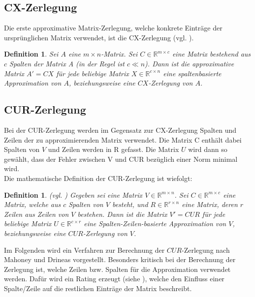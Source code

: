 \documentclass[12pt,a4paper,twoside]{article}
\newtheorem{Definition}[Satz]{Definition}
\begin{document}
	\subsection{CX-Zerlegung}
		\label{subsec:CX}
		Die erste approximative Matrix-Zerlegung, welche konkrete Einträge der ursprünglichen Matrix verwendet, ist die CX-Zerlegung (vgl. \citep{Drineas2009}). 
		\begin{Definition}
			Sei $A$ eine $m\times n$-Matrix. Sei $C\in \mathds{R}^{m\times c}$ eine Matrix bestehend aus $c$ Spalten der Matrix A (in der Regel ist $c\ll n$). Dann ist die approximative Matrix $A'=CX$ für jede beliebige Matrix $X\in \mathds{R}^{c\times n}$ eine spaltenbasierte Approximation von $A$, beziehungsweise eine $CX$-Zerlegung von $A$.
		\end{Definition}
	\subsection{CUR-Zerlegung}	
		\label{subsec:CUR}
		Bei der CUR-Zerlegung werden im Gegensatz zur CX-Zerlegung Spalten und Zeilen der zu approximierenden Matrix 
		verwendet. Die Matrix C enthält dabei Spalten von $V$ und Zeilen werden in R gefasst. Die Matrix $U$ wird 
		dann so gewählt, dass der Fehler zwischen V und CUR bezüglich einer Norm minimal wird. \\
		Die mathematische Definition der CUR-Zerlegung ist wiefolgt:
		\begin{Definition}{(vgl. \citep{Drineas2009})}
			Gegeben sei eine Matrix $V\in \mathds{R}^{m\times n}$. Sei $C\in\mathds{R}^{m\times 
			c}$ eine Matrix, welche aus $c$ Spalten von $V$ besteht, und $R\in\mathds{R}^{r\times n}$ eine Matrix, 
			deren $r$ Zeilen aus Zeilen von $V$ bestehen. Dann ist die Matrix $V'=CUR$ für jede beliebige Matrix $U
			\in\mathds{R}^{c\times r}$ eine Spalten-Zeilen-basierte Approximation von $V$, beziehungsweise eine $CUR
			$-Zerlegung von $V$.
		\end{Definition}
		Im Folgenden wird ein Verfahren zur Berechnung der $CUR$-Zerlegung nach Mahoney und Drineas \citep{mahoney2008} vorgestellt. \newline
		\newline
		Besonders kritisch bei der Berechnung der Zerlegung ist, welche Zeilen bzw. Spalten für die Approximation 
		verwendet werden.
		Dafür wird ein Rating erzeugt (siehe \citep{mahoney2008}), welche den Einfluss einer Spalte/Zeile auf die 
		restlichen Einträge der Matrix beschreibt. \newline
		\newline	
\end{document}
